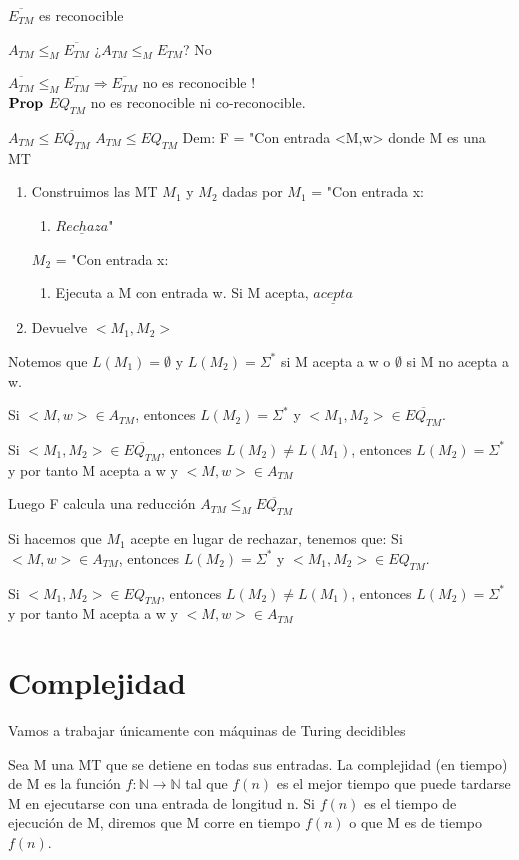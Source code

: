 \documentclass{homework}
\begin{document}
$\overline{E_{TM}}$ es reconocible

$A_{TM} \leq_M \overline{E_{TM}}$ ¿$A_{TM} \leq_M E_{TM}$? No

$\overline{A_{TM}} \leq_M \overline{E_{TM}} \Rightarrow \overline{E_{TM}}$ no es reconocible !\\

$\bf{Prop}$ $EQ_{TM}$ no es reconocible ni co-reconocible.

$A_{TM} \leq \overline{EQ_{TM}}$
$A_{TM} \leq EQ_{TM}$
Dem: F = "Con entrada <M,w> donde M es una MT
\begin{enumerate}
	\item Construimos las MT $M_1$ y $M_2$ dadas por 
	$M_1$ = "Con entrada x:
	\begin{enumerate}
		\item $\underline{Rechaza}$"
	\end{enumerate}
	$M_2$ = "Con entrada x:
	\begin{enumerate}
		\item Ejecuta a M con entrada w.
			  Si M acepta, $\underline{acepta}$
	\end{enumerate}
	\item Devuelve $<M_1, M_2>$
\end{enumerate}
Notemos que $L(M_1) = \emptyset$ y $L(M_2) = \Sigma^{*}$ si M acepta a w o $\emptyset$ si M no acepta a w.

Si $<M,w> \in A_{TM}$, entonces $L(M_2) = \Sigma^{*}$ y $<M_1,M_2> \in \overline{EQ_{TM}}$.

Si $<M_1,M_2> \in \overline{EQ_{TM}}$, entonces $L(M_2) \neq L(M_1)$, entonces $L(M_2) = \Sigma^{*}$ y por tanto M acepta a w y $<M,w> \in A_{TM}$

Luego F calcula una reducción $A_{TM} \leq_M \overline{EQ_{TM}}$

Si hacemos que $M_1$ acepte en lugar de rechazar, tenemos que:
Si $<M,w> \in A_{TM}$, entonces $L(M_2) = \Sigma^{*}$ y $<M_1,M_2> \in EQ_{TM}$.

Si $<M_1,M_2> \in EQ_{TM}$, entonces $L(M_2) \neq L(M_1)$, entonces $L(M_2) = \Sigma^{*}$ y por tanto M acepta a w y $<M,w> \in A_{TM}$

\section{Complejidad}

Vamos a trabajar únicamente con máquinas de Turing decidibles

Sea M una MT que se detiene en todas sus entradas. La complejidad (en tiempo) de M es la función $f: \mathds{N} \rightarrow \mathds{N}$ tal que $f(n)$ es el mejor tiempo que puede tardarse M en ejecutarse con una entrada de longitud n. Si $f(n)$ es el tiempo de ejecución de M, diremos que M corre en tiempo $f(n)$ o que M es de tiempo $f(n)$.
\end{document}
